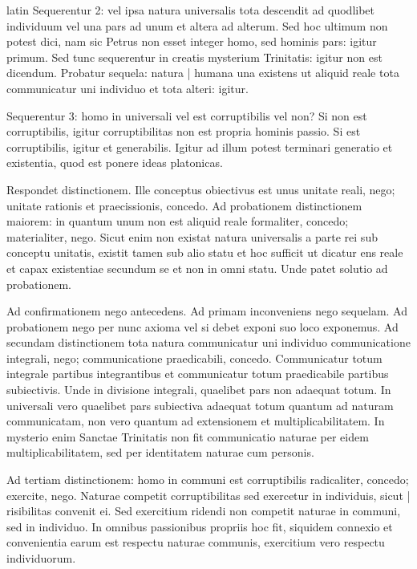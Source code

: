 \begin{otherlanguage*}{latin}
\pstart
Sequerentur 2:
vel ipsa natura universalis tota descendit ad quodlibet individuum vel una pars ad unum et altera ad alterum. Sed hoc ultimum non potest dici, nam sic Petrus non esset integer homo, sed hominis pars:
igitur primum. Sed tunc sequerentur in creatis mysterium Trinitatis:
igitur non est dicendum. Probatur sequela:
natura \textnormal{|} humana una existens ut aliquid reale tota communicatur uni individuo et tota alteri:
igitur. 
\pend

\pstart
Sequerentur 3:
homo in universali vel est corruptibilis vel non? Si non est corruptibilis, igitur corruptibilitas non est propria hominis passio. Si est corruptibilis, igitur et generabilis. Igitur ad illum potest terminari generatio et existentia, quod est ponere ideas platonicas. 
\pend

\pstart
Respondet distinctionem. Ille conceptus obiectivus est unus unitate reali, nego; unitate rationis et praecissionis, concedo. Ad probationem distinctionem maiorem:
in quantum unum non est aliquid reale formaliter, concedo; materialiter, nego. Sicut enim non existat natura universalis a parte rei sub conceptu unitatis, existit tamen sub alio statu et hoc sufficit ut dicatur ens reale et capax existentiae secundum se et non in omni statu. Unde patet solutio ad probationem. 
\pend

\pstart
Ad confirmationem nego antecedens. Ad primam inconveniens nego sequelam. Ad probationem nego per nunc axioma vel si debet exponi suo loco exponemus. Ad secundam distinctionem tota natura communicatur uni individuo communicatione integrali, nego; communicatione praedicabili, concedo. Communicatur totum integrale partibus integrantibus et communicatur totum praedicabile partibus subiectivis. Unde in divisione integrali, quaelibet pars non adaequat totum. In universali vero quaelibet pars subiectiva adaequat totum quantum ad naturam communicatam, non vero quantum ad extensionem et multiplicabilitatem. In mysterio enim Sanctae Trinitatis non fit communicatio naturae per eidem multiplicabilitatem, sed per identitatem naturae cum personis. 
\pend

\pstart
Ad tertiam distinctionem:
homo in communi est corruptibilis radicaliter, concedo; exercite, nego. Naturae competit corruptibilitas sed exercetur in individuis, sicut \textnormal{|} risibilitas convenit ei. Sed exercitium ridendi non competit naturae in communi, sed in individuo. In omnibus passionibus propriis hoc fit, siquidem connexio et convenientia earum est respectu naturae communis, exercitium vero respectu individuorum. 
\pend


\end{otherlanguage*}
